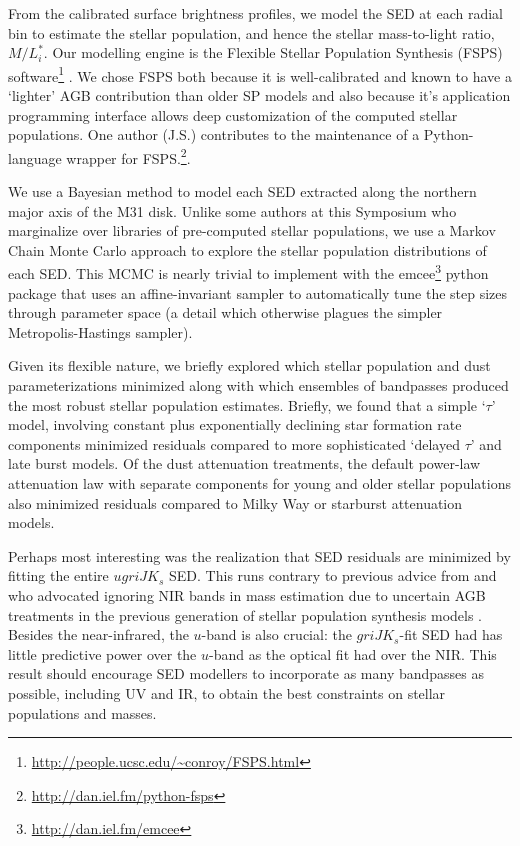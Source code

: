 \documentclass{iau}
\begin{document}
From the calibrated surface brightness profiles, we model the SED at each radial bin to estimate the stellar population, and hence the stellar mass-to-light ratio, $M/L_i^*$.
Our modelling engine is the Flexible Stellar Population Synthesis (FSPS) software\footnote{\url{http://people.ucsc.edu/~conroy/FSPS.html}} \citep{Conroy:2009,Conroy:2010}.
We chose FSPS both because it is well-calibrated and known to have a `lighter' AGB contribution than older SP models \citep[e.g.,][]{Bruzual:2003} and also because it's application programming interface allows deep customization of the computed stellar populations.
One author (J.S.) contributes to the maintenance of a Python-language wrapper for FSPS.\footnote{\url{http://dan.iel.fm/python-fsps}}.

We use a Bayesian method to model each SED extracted along the northern major axis of the M31 disk.
Unlike some authors at this Symposium who marginalize over libraries of pre-computed stellar populations, we use a Markov Chain Monte Carlo approach to explore the stellar population distributions of each SED.
This MCMC is nearly trivial to implement with the emcee\footnote{\url{http://dan.iel.fm/emcee}} python package \citep{Foreman-Mackey:2010} that uses an affine-invariant sampler \cite{Goodman:2009} to automatically tune the step sizes through parameter space (a detail which otherwise plagues the simpler Metropolis-Hastings sampler).

Given its flexible nature, we briefly explored which stellar population and dust parameterizations minimized along with which ensembles of bandpasses produced the most robust stellar population estimates.
Briefly, we found that a simple `$\tau$' model, involving constant plus exponentially declining star formation rate components minimized residuals compared to more sophisticated `delayed $\tau$' and late burst models.
Of the dust attenuation treatments, the default power-law attenuation law with separate components for young and older stellar populations also minimized residuals compared to Milky Way or starburst attenuation models.

Perhaps most interesting was the realization that SED residuals are minimized by fitting the entire $ugriJK_s$ SED.
This runs contrary to previous advice from \cite{Taylor:2011} and \cite{Zibetti:2009} who advocated ignoring NIR bands in mass estimation due to uncertain AGB treatments in the previous generation of stellar population synthesis models \citep[e.g.][]{Bruzual:2003,Maraston:2005}.
Besides the near-infrared, the $u$-band is also crucial: the $griJK_s$-fit SED had has little predictive power over the $u$-band as the optical fit had over the NIR.
This result should encourage SED modellers to incorporate as many bandpasses as possible, including UV and IR, to obtain the best constraints on stellar populations and masses.
\end{document}
